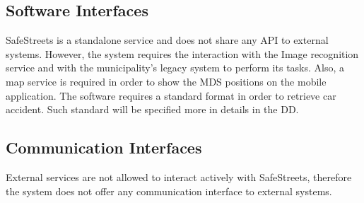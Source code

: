 \subsection{Software Interfaces}
SafeStreets is a standalone service and does not share any API to 
external systems. However, the system requires the interaction with the Image recognition service and with the municipality's legacy system to perform its tasks. Also, a map service is required in order to show the MDS positions on the mobile application.\newline
The software requires a standard format in order to retrieve car accident.
Such standard will be specified more in details in the DD.
\subsection{Communication Interfaces}
External services are not allowed to interact actively with SafeStreets, therefore the system does not offer any communication interface to external systems.
